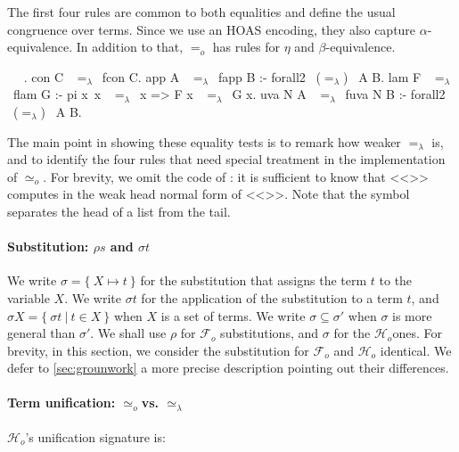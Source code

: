\documentclass[sigconf,natbib=false,review]{acmart}
\newcommand{\EqualRel}{\ensuremath{=}}
\newcommand{\UnifRel}{\ensuremath{\simeq}}
\newcommand{\Uo}{\texorpdfstring{\ensuremath{\UnifRel_o}\xspace}{unif\_o}}
\newcommand{\Eo}{\ensuremath{\EqualRel_o}\xspace}
\newcommand{\Ue}{\ensuremath{\UnifRel_\lambda}\xspace}
\newcommand{\Ee}{\ensuremath{\EqualRel_\lambda}\xspace}
\newcommand{\Fo}{\texorpdfstring{\ensuremath{\mathcal{F}_{\!o}\xspace}}{Fo}} %
\newcommand{\Ho}{\texorpdfstring{\ensuremath{\mathcal{H}_o}\xspace}{Ho}}
\begin{document}
The first four rules are common to both equalities
and define the usual congruence over terms. Since
we use an HOAS encoding, they also capture $\alpha$-equivalence.
In addition to that, \Eo has rules for $\eta$ and $\beta$-equivalence.



\begin{elpicode}
  ~ \PYG{n+nf}{(\Ee)} ~.
  con C ~\Ee~fcon C.
  app A ~\Ee~fapp B :- forall2 ~(\Ee)~ A B.
  lam F ~\Ee~flam G :- pi x\ x ~\Ee~x => F x ~\Ee~G x.
  uva N A ~\Ee~fuva N B :- forall2 ~(\Ee)~ A B.
\end{elpicode}

\noindent
The main point in showing these equality tests is to remark how
weaker \Ee is, and to identify the four rules that need special
treatment in the implementation of \Uo.
For brevity, we omit the code of :
it is sufficient to know that <<>> computes in  the
weak head normal form of <<>>.
Note that the symbol \elpiIn{|} separates the head of a list from the tail.

\paragraph{Substitution: $\rho s$ and $\sigma t$}

We write $\sigma = \{~ X \mapsto t ~\}$ for the substitution that assigns
the term $t$ to the variable $X$.
We write $\sigma t$ for the application of
the substitution to a term $t$, and $\sigma X = \{~ \sigma t ~|~ t \in X ~\}$ when
$X$ is a set of terms.
We write $\sigma \subseteq \sigma'$ when $\sigma$ is more
general than $\sigma'$.
We shall use $\rho$ for \Fo{} substitutions,
and $\sigma$ for the \Ho ones.
For brevity, in this section, we consider
the substitution for \Fo{} and \Ho{} identical.
We defer to \cref{sec:grounwork} a more precise description
pointing out their differences.

\paragraph{Term unification: \Uo vs. \Ue}

\Ho{}'s unification signature is:
\end{document}
